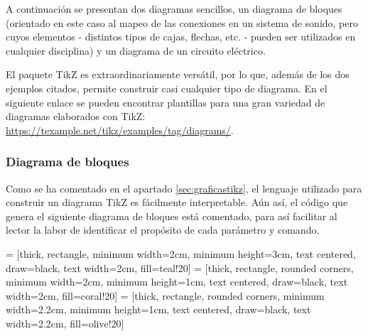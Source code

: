 \documentclass[a4paper, 11pt, spanish, twoside]{article}
\begin{document}
A continuación se presentan dos diagramas sencillos, un diagrama de bloques (orientado en este caso al mapeo de las conexiones en un sistema de sonido, pero cuyos elementos - distintos tipos de cajas, flechas, etc. - pueden ser utilizados en cualquier disciplina) y un diagrama de un circuito eléctrico. 

El paquete TikZ es extraordinariamente versátil, por lo que, además de los dos ejemplos citados, permite construir casi cualquier tipo de diagrama. En el siguiente enlace se pueden encontrar plantillas para una gran variedad de diagramas elaborados con TikZ: \url{https://texample.net/tikz/examples/tag/diagrams/}.


\subsubsection{Diagrama de bloques}

Como se ha comentado en el apartado \ref{sec:graficastikz}, el lenguaje utilizado para construir un diagrama TikZ es fácilmente interpretable. Aún así, el código que genera el siguiente diagrama de bloques está comentado, para así facilitar al lector la labor de identificar el propósito de cada parámetro y comando.

 = [thick, rectangle, minimum width=2cm, minimum height=3cm, text centered, draw=black, text width=2cm, fill=teal!20] 
 = [thick, rectangle, rounded corners, minimum width=2cm, minimum height=1cm, text centered, draw=black, text width=2cm, fill=coral!20]
 = [thick, rectangle, rounded corners, minimum width=2.2cm, minimum height=1cm, text centered, draw=black, text width=2.2cm, fill=olive!20]
\end{document}
